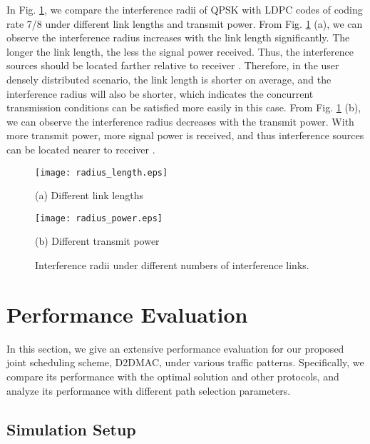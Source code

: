 \documentclass[journal]{IEEEtran}
\begin{document}
In Fig. \ref{fig:infer_radii_2}, we compare the interference radii of QPSK with LDPC codes of
coding rate 7/8 under different link lengths and transmit power. From Fig. \ref{fig:infer_radii_2}
(a), we can observe the interference radius increases with the link length 
significantly. The longer the link length, the less the signal power received. Thus, the interference
sources should be located farther relative to receiver . Therefore, in the user densely distributed scenario, the link length is shorter on average, and the interference radius will also be shorter, which indicates the concurrent transmission conditions can be satisfied more easily in this case. From Fig. \ref{fig:infer_radii_2}
(b), we can observe the interference radius decreases with the transmit power. With more transmit
power, more signal power is received, and thus interference sources can be located nearer to
receiver .



\begin{figure}[htbp]
\begin{minipage}[t]{0.5\linewidth}
\centering
\texttt{[image: radius\_length.eps]}
\centerline{\small (a) Different link lengths }
\end{minipage}\begin{minipage}[t]{0.5\linewidth}
\centering
\texttt{[image: radius\_power.eps]}
\centerline{\small (b) Different transmit power}
\end{minipage}\caption{Interference radii under different numbers of interference links.}
\label{fig:infer_radii_2} \vspace*{-3mm}
\end{figure}



\section{Performance Evaluation}\label{S6}

In this section, we give an extensive performance evaluation for our proposed joint scheduling
scheme, D2DMAC, under various traffic patterns. Specifically, we compare its performance with the
optimal solution and other protocols, and analyze its performance with different path selection
parameters.







\subsection{Simulation Setup}\label{S6-1}
\end{document}
